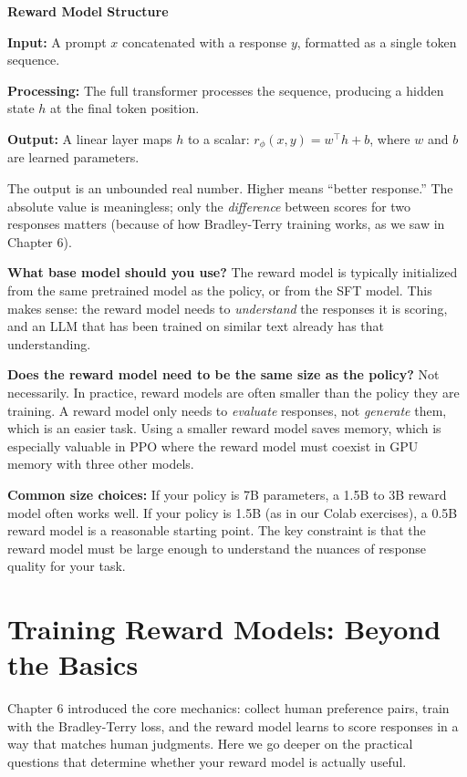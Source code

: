 \begin{chapterenv}
\begin{infobox}
\textbf{Reward Model Structure}

\textbf{Input:} A prompt $x$ concatenated with a response $y$, formatted as a single token sequence.

\textbf{Processing:} The full transformer processes the sequence, producing a hidden state $h$ at the final token position.

\textbf{Output:} A linear layer maps $h$ to a scalar: $r_\phi(x, y) = w^\top h + b$, where $w$ and $b$ are learned parameters.

The output is an unbounded real number. Higher means ``better response.'' The absolute value is meaningless; only the \textit{difference} between scores for two responses matters (because of how Bradley-Terry training works, as we saw in Chapter 6).
\end{infobox}

\textbf{What base model should you use?} The reward model is typically initialized from the same pretrained model as the policy, or from the SFT model. This makes sense: the reward model needs to \textit{understand} the responses it is scoring, and an LLM that has been trained on similar text already has that understanding.

\textbf{Does the reward model need to be the same size as the policy?} Not necessarily. In practice, reward models are often smaller than the policy they are training. A reward model only needs to \textit{evaluate} responses, not \textit{generate} them, which is an easier task. Using a smaller reward model saves memory, which is especially valuable in PPO where the reward model must coexist in GPU memory with three other models.

\begin{tipbox}
\textbf{Common size choices:} If your policy is 7B parameters, a 1.5B to 3B reward model often works well. If your policy is 1.5B (as in our Colab exercises), a 0.5B reward model is a reasonable starting point. The key constraint is that the reward model must be large enough to understand the nuances of response quality for your task.
\end{tipbox}

\section{Training Reward Models: Beyond the Basics}

Chapter 6 introduced the core mechanics: collect human preference pairs, train with the Bradley-Terry loss, and the reward model learns to score responses in a way that matches human judgments. Here we go deeper on the practical questions that determine whether your reward model is actually useful.


\end{chapterenv}
